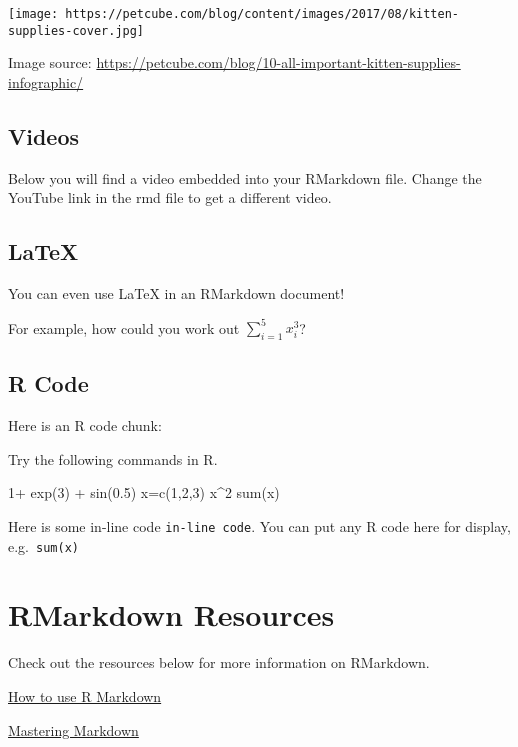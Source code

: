 \documentclass[
]{article}
\newenvironment{Shaded}{\begin{snugshade}}{\end{snugshade}}
\newcommand{\DecValTok}[1]{\textcolor[rgb]{0.00,0.00,0.81}{#1}}
\newcommand{\FloatTok}[1]{\textcolor[rgb]{0.00,0.00,0.81}{#1}}
\newcommand{\FunctionTok}[1]{\textcolor[rgb]{0.00,0.00,0.00}{#1}}
\newcommand{\NormalTok}[1]{#1}
\newcommand{\OtherTok}[1]{\textcolor[rgb]{0.56,0.35,0.01}{#1}}
\newcommand{\SpecialCharTok}[1]{\textcolor[rgb]{0.00,0.00,0.00}{#1}}
\begin{document}
\texttt{[image: https://petcube.com/blog/content/images/2017/08/kitten-supplies-cover.jpg]}

Image source:
\url{https://petcube.com/blog/10-all-important-kitten-supplies-infographic/}

\hypertarget{videos}{%
\subsection{Videos}\label{videos}}

Below you will find a video embedded into your RMarkdown file. Change
the YouTube link in the rmd file to get a different video.

\hypertarget{latex}{%
\subsection{LaTeX}\label{latex}}

You can even use LaTeX in an RMarkdown document!

For example, how could you work out \(\sum_{i=1}^{5} x_{i}^3\)?

\hypertarget{r-code}{%
\subsection{R Code}\label{r-code}}

Here is an R code chunk:

Try the following commands in R.

\begin{Shaded}
\begin{Highlighting}[]
\DecValTok{1}\SpecialCharTok{+} \FunctionTok{exp}\NormalTok{(}\DecValTok{3}\NormalTok{) }\SpecialCharTok{+} \FunctionTok{sin}\NormalTok{(}\FloatTok{0.5}\NormalTok{)}
\NormalTok{x}\OtherTok{=}\FunctionTok{c}\NormalTok{(}\DecValTok{1}\NormalTok{,}\DecValTok{2}\NormalTok{,}\DecValTok{3}\NormalTok{)}
\NormalTok{x}\SpecialCharTok{\^{}}\DecValTok{2}
\FunctionTok{sum}\NormalTok{(x)}
\end{Highlighting}
\end{Shaded}

Here is some in-line code \texttt{in-line\ code}. You can put any R code
here for display, e.g.~\texttt{sum(x)}

\hypertarget{rmarkdown-resources}{%
\section{RMarkdown Resources}\label{rmarkdown-resources}}

Check out the resources below for more information on RMarkdown.

\href{https://www.oreilly.com/learning/easy-reproducible-reports-with-r?utm_medium=social\&utm_source=twitter.com\&utm_campaign=lgen\&utm_content=data+webcast+ki\&cmp=tw-data-na-article-lgen_tw_webcast_ki}{How
to use R Markdown}

\href{https://guides.github.com/features/mastering-markdown/}{Mastering
Markdown}
\end{document}
